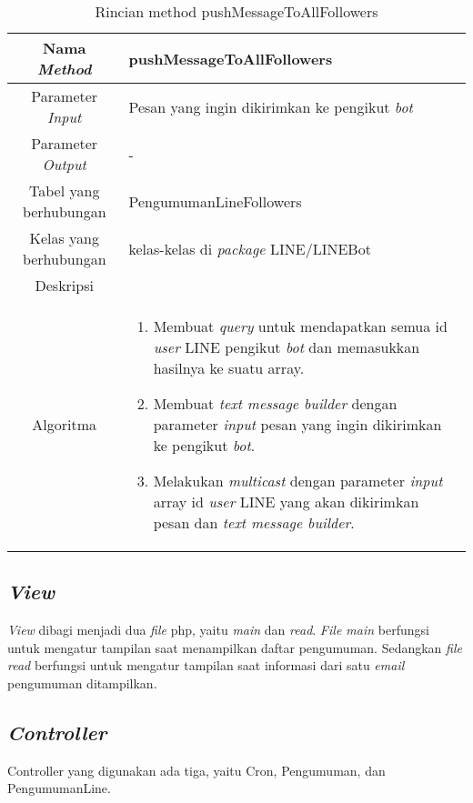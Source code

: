 \begin{center}
	\begin{table}[H]
	\caption{Rincian method pushMessageToAllFollowers}
	\label{table:pengumuman-line-model-pushmessagetoallfollowers}
\begin{tabular}{|c|p{11cm}|}
\hline
Nama \textit{Method} 	& 	 pushMessageToAllFollowers	\\
\hline
Parameter \textit{Input} & Pesan yang ingin dikirimkan ke pengikut \textit{bot} \\
\hline
Parameter \textit{Output} & - \\
\hline
Tabel yang berhubungan & PengumumanLineFollowers \\
\hline
Kelas yang berhubungan & kelas-kelas di \textit{package} LINE/LINEBot \\
\hline
Deskripsi	& \\
\hline
Algoritma	& \begin{enumerate}
				\item Membuat \textit{query} untuk mendapatkan semua id \textit{user} LINE pengikut \textit{bot} dan memasukkan hasilnya ke suatu array.
				\item Membuat \textit{text message builder} dengan parameter \textit{input} pesan yang ingin dikirimkan ke pengikut \textit{bot}.
				\item Melakukan \textit{multicast} dengan parameter \textit{input} array id \textit{user} LINE yang akan dikirimkan pesan dan \textit{text message builder}.
				\end{enumerate} \\
\hline
\end{tabular}
\end{table}
\end{center}

\subsection{\textit{View}}
\textit{View} dibagi menjadi dua \textit{file} php, yaitu \textit{main} dan \textit{read}. \textit{File main} berfungsi untuk mengatur tampilan saat menampilkan daftar pengumuman. Sedangkan \textit{file read} berfungsi untuk mengatur tampilan saat informasi dari satu \textit{email} pengumuman ditampilkan.

\subsection{\textit{Controller}}
Controller yang digunakan ada tiga, yaitu Cron, Pengumuman, dan PengumumanLine.
